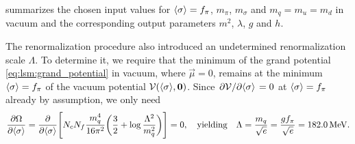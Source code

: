  summarizes the chosen input values for $\langle \sigma \rangle=f_\pi$, $m_\pi$, $m_\sigma$ and $m_q=m_u=m_d$ in vacuum
and the corresponding output parameters $m^2$, $\lambda$, $g$ and $h$.

The renormalization procedure also introduced an undetermined renormalization scale $\Lambda$.
To determine it, we require that the minimum of the grand potential \eqref{eq:lsm:grand_potential} in vacuum, where $\vec{\mu}=0$,
remains at the minimum $\langle \sigma \rangle = f_\pi$ of the vacuum potential $\mathcal{V}(\langle \sigma \rangle,{\bm{0}})$.
Since $\pdv{\mathcal{V}}/{\langle \sigma \rangle} = 0$ at $\langle \sigma \rangle=f_\pi$ already by assumption, we only need
\begin{equation}
	\pdv{\Omega}{ \langle \sigma \rangle} =
	\pdv*{\Bigg[ N_c N_f \frac{m_q^4}{16 \pi^2} \bigg( \frac32 + \log \frac{\Lambda^2}{m_q^2} \bigg) \Bigg] }{\langle \sigma \rangle} = 0,
	\quad \text{yielding} \quad
	\Lambda = \frac{m_q}{\sqrt{e}} = \frac{g f_\pi}{\sqrt{e}} = \SI{182.0}{\mega\electronvolt}.
\label{eq:lsm:potential_vacuum_minimum}
\end{equation}

